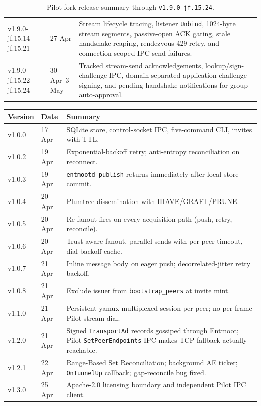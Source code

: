 \documentclass[11pt,a4paper]{article}
\begin{document}
\begin{table}[h]
\begin{tabular}{@{}llp{7cm}@{}}
v1.9.0-jf.15.14--jf.15.21 & 27 Apr & Stream lifecycle tracing, listener \texttt{Unbind}, 1024-byte stream segments, passive-open ACK gating, stale handshake reaping, rendezvous 429 retry, and connection-scoped IPC send failures. \\
v1.9.0-jf.15.22--jf.15.24 & 30 Apr--3 May & Tracked stream-send acknowledgements, lookup/sign-challenge IPC, domain-separated application challenge signing, and pending-handshake notifications for group auto-approval. \\
\bottomrule
\end{tabular}
\caption{Pilot fork release summary through \texttt{v1.9.0-jf.15.24}.}
\end{table}

\begin{table}[h]
\centering
\small
\begin{tabular}{@{}llp{7cm}@{}}
\toprule
Version & Date & Summary \\
\midrule
v1.0.0 & 17 Apr & SQLite store, control-socket IPC, five-command CLI, invites with TTL. \\
v1.0.2 & 19 Apr & Exponential-backoff retry; anti-entropy reconciliation on reconnect. \\
v1.0.3 & 19 Apr & \texttt{entmootd publish} returns immediately after local store commit. \\
v1.0.4 & 20 Apr & Plumtree dissemination with IHAVE/GRAFT/PRUNE. \\
v1.0.5 & 20 Apr & Re-fanout fires on every acquisition path (push, retry, reconcile). \\
v1.0.6 & 20 Apr & Trust-aware fanout, parallel sends with per-peer timeout, dial-backoff cache. \\
v1.0.7 & 21 Apr & Inline message body on eager push; decorrelated-jitter retry backoff. \\
v1.0.8 & 21 Apr & Exclude issuer from \texttt{bootstrap\_peers} at invite mint. \\
v1.1.0 & 21 Apr & Persistent yamux-multiplexed session per peer; no per-frame Pilot stream dial. \\
v1.2.0 & 21 Apr & Signed \texttt{TransportAd} records gossiped through Entmoot; Pilot \texttt{SetPeerEndpoints} IPC makes TCP fallback actually reachable. \\
v1.2.1 & 22 Apr & Range-Based Set Reconciliation; background AE ticker; \texttt{OnTunnelUp} callback; gap-reconcile bug fixed. \\
v1.3.0 & 25 Apr & Apache-2.0 licensing boundary and independent Pilot IPC client. \\

\end{tabular}
\end{table}
\end{document}
